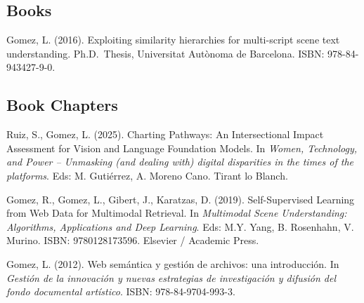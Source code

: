 \documentclass[11pt]{article}
\newcommand{\venue}[1]{\textit{#1}}
\begin{document}
\subsection*{Books}
\begin{pubs}
\item Gomez, L. (2016). Exploiting similarity hierarchies for multi-script scene text understanding. Ph.D.\ Thesis, Universitat Autònoma de Barcelona. ISBN: 978-84-943427-9-0.
\end{pubs}

\subsection*{Book Chapters}
\begin{pubs}
\item Ruiz, S., Gomez, L. (2025). Charting Pathways: An Intersectional Impact Assessment for Vision and Language Foundation Models. In \venue{Women, Technology, and Power -- Unmasking (and dealing with) digital disparities in the times of the platforms}. Eds: M. Gutiérrez, A. Moreno Cano. Tirant lo Blanch.
\item Gomez, R., Gomez, L., Gibert, J., Karatzas, D. (2019). Self-Supervised Learning from Web Data for Multimodal Retrieval. In \venue{Multimodal Scene Understanding: Algorithms, Applications and Deep Learning}. Eds: M.Y. Yang, B. Rosenhahn, V. Murino. ISBN: 9780128173596. Elsevier / Academic Press.
\item Gomez, L. (2012). Web semántica y gestión de archivos: una introducción. In \venue{Gestión de la innovación y nuevas estrategias de investigación y difusión del fondo documental artístico}. ISBN: 978-84-9704-993-3.
\end{pubs}
\end{document}

